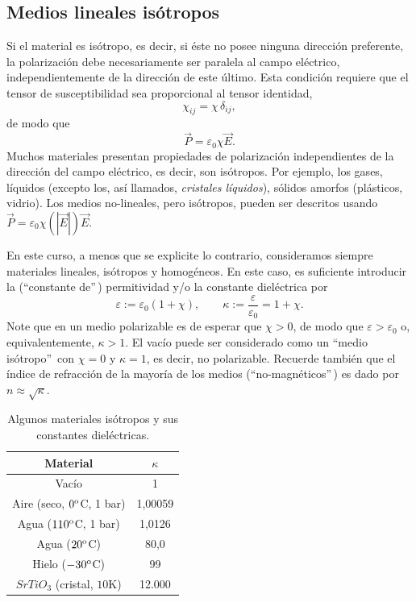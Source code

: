 \subsection{Medios lineales isótropos}\label{sec:iso}
Si el material es isótropo, es decir, si éste no posee ninguna dirección
preferente, la polarización debe necesariamente ser paralela al campo
eléctrico, independientemente de la dirección de este último. Esta condición requiere que el tensor de susceptibilidad sea proporcional al tensor identidad,
\begin{equation}
\chi_{ij}=\chi\,\delta_{ij},
\end{equation}
de modo que
\begin{equation}
\vec{P}=\varepsilon_0\chi\vec{E}.
\end{equation}
Muchos materiales presentan propiedades de polarización independientes de
la dirección del campo eléctrico, es decir, son isótropos. Por ejemplo, los
gases, líquidos (excepto los, así llamados, \textit{cristales líquidos}), sólidos amorfos (plásticos, vidrio).
Los medios no-lineales, pero isótropos, pueden ser descritos usando
$\vec{P}=\varepsilon_0\chi(|\vec{E}|)\vec{E}$.

En este curso, a menos que se explicite lo contrario, consideramos siempre
materiales lineales, isótropos y homogéneos. En este caso, es suficiente
introducir la (``constante de''\,) permitividad y/o la constante dieléctrica
por
\begin{equation}
\varepsilon:=\varepsilon_0(1+\chi), \qquad
\kappa:=\frac{\varepsilon}{\varepsilon_0}=1+\chi.
\end{equation}
Note que en un medio polarizable es de esperar que $\chi>0$, de modo que
$\varepsilon>\varepsilon_0$ o, equivalentemente, $\kappa>1$. El vacío puede ser
considerado como un ``medio isótropo''\, con $\chi=0$ y $\kappa=1$, es decir, no polarizable.
Recuerde también que el índice de refracción de la mayoría de los medios
(``no-magnéticos''\,) es dado por $n\approx\sqrt{\kappa}$.
\begin{table}[!h]
\begin{center}
\begin{tabular}{c|c}
Material &   $\kappa$ \\ \hline\hline
Vacío & 1 \\
Aire (seco, $0^{\rm o}$C, 1 bar)  & 1,00059 \\
Agua ($110^{\rm o}$C, 1 bar)  & 1,0126 \\
Agua ($20^{\rm o}$C) &  80,0 \\
Hielo ($-30^{\rm o}$C) &  99 \\
$SrTiO_3$ (cristal, $10$K)  & 12.000 \\
\end{tabular}
\caption{Algunos materiales isótropos y sus constantes dieléctricas.}
\end{center}
\end{table}


